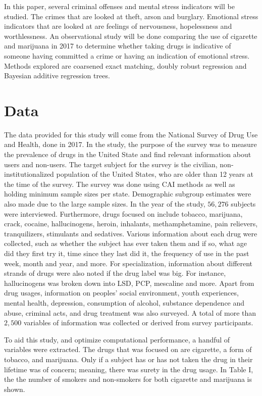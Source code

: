 \documentclass[a4paper, 10pt, conference]{ieeeconf}
\begin{document}
In this paper, several criminal offenses and mental stress indicators will be studied. The crimes that are looked at theft, arson and burglary. Emotional stress indicators that are looked at are feelings of nervousness, hopelessness and worthlessness. An observational study will be done comparing the use of cigarette and marijuana in 2017 to determine whether taking drugs is indicative of someone having committed a crime or having an indication of emotional stress. Methods explored are coarsened exact matching, doubly robust regression and Bayesian additive regression trees. 


\section{Data}

The data provided for this study will come from the National Survey of Drug Use and Health, done in 2017. In the study, the purpose of the survey was to measure the prevalence of drugs in the United State and find relevant information about users and non-users. The target subject for the survey is the civilian, non-institutionalized population of the United States, who are older than 12 years at the time of the survey. The survey was done using CAI methods as well as holding minimum sample sizes per state. Demographic subgroup estimates were also made due to the large sample sizes. In the year of the study, $56, 276$ subjects were interviewed. Furthermore, drugs focused on include tobacco, marijuana, crack, cocaine, hallucinogens, heroin, inhalants, methamphetamine, pain relievers, tranquilizers, stimulants and sedatives. Various information about each drug were collected, such as whether the subject has ever taken them and if so, what age did they first try it, time since they last did it, the frequency of use in the past week, month and year, and more. For specialization, information about different strands of drugs were also noted if the drug label was big. For instance, hallucinogens was broken down into LSD, PCP, mescaline and more. Apart from drug usages, information on peoples' social environment, youth experiences, mental health, depression, consumption of alcohol, substance dependence and abuse, criminal acts, and drug treatment was also surveyed. A total of more than $2,500$ variables of information was collected or derived from survey participants. 

To aid this study, and optimize computational performance, a handful of variables were extracted. The drugs that was focused on are cigarette, a form of tobacco, and marijuana. Only if a subject has or has not taken the drug in their lifetime was of concern; meaning, there was surety in the drug usage. In Table I, the the number of smokers and non-smokers for both cigarette and marijuana is shown. 
\end{document}
